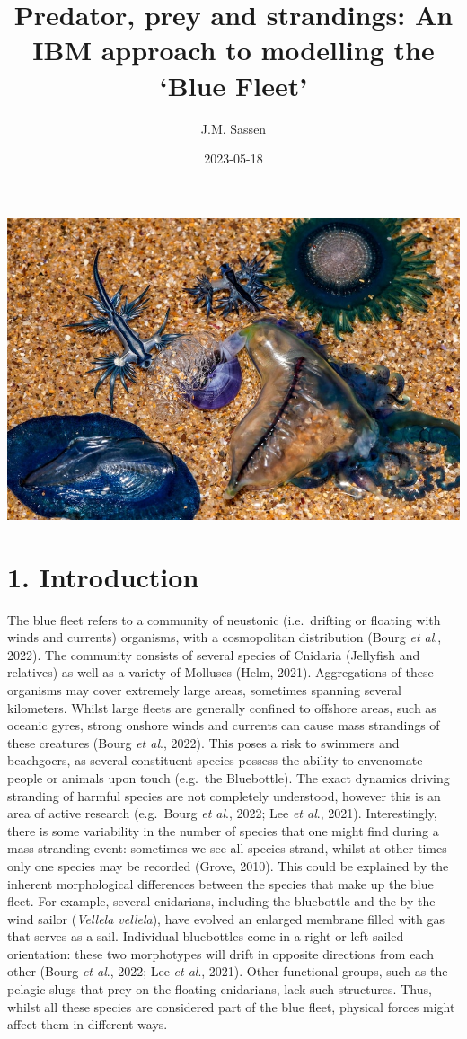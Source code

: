 \documentclass[
]{article}
\title{Predator, prey and strandings: An IBM approach to modelling the
`Blue Fleet'}
\author{J.M. Sassen}
\date{2023-05-18}
\begin{document}
\maketitle

\includegraphics{./Images/BlueFleet_Image_ABC.jpeg}

\hypertarget{introduction}{%
\section{1. Introduction}\label{introduction}}

The blue fleet refers to a community of neustonic (i.e.~drifting or
floating with winds and currents) organisms, with a cosmopolitan
distribution (Bourg \emph{et al}., 2022). The community consists of
several species of Cnidaria (Jellyfish and relatives) as well as a
variety of Molluscs (Helm, 2021). Aggregations of these organisms may
cover extremely large areas, sometimes spanning several kilometers.
Whilst large fleets are generally confined to offshore areas, such as
oceanic gyres, strong onshore winds and currents can cause mass
strandings of these creatures (Bourg \emph{et al}., 2022). This poses a
risk to swimmers and beachgoers, as several constituent species possess
the ability to envenomate people or animals upon touch (e.g.~the
Bluebottle). The exact dynamics driving stranding of harmful species are
not completely understood, however this is an area of active research
(e.g.~Bourg \emph{et al}., 2022; Lee \emph{et al}., 2021).
Interestingly, there is some variability in the number of species that
one might find during a mass stranding event: sometimes we see all
species strand, whilst at other times only one species may be recorded
(Grove, 2010). This could be explained by the inherent morphological
differences between the species that make up the blue fleet. For
example, several cnidarians, including the bluebottle and the
by-the-wind sailor (\emph{Vellela vellela}), have evolved an enlarged
membrane filled with gas that serves as a sail. Individual bluebottles
come in a right or left-sailed orientation: these two morphotypes will
drift in opposite directions from each other (Bourg \emph{et al}., 2022;
Lee \emph{et al}., 2021). Other functional groups, such as the pelagic
slugs that prey on the floating cnidarians, lack such structures. Thus,
whilst all these species are considered part of the blue fleet, physical
forces might affect them in different ways.
\end{document}
